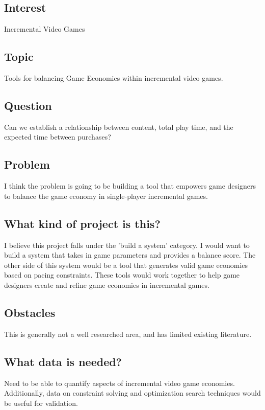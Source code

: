 \subsection*{Interest} 
Incremental Video Games

\subsection*{Topic} 
Tools for balancing Game Economies within incremental video games.

\subsection*{Question} 
Can we establish a relationship between content, total play time, and the expected time between purchases?

\subsection*{Problem} 
I think the problem is going to be building a tool that empowers game designers
to balance the game economy in single-player incremental games.

\subsection*{What kind of project is this?} 
I believe this project falls under the 'build a system' category.
I would want to build a system that takes in game parameters and provides a balance score.
The other side of this system would be a tool that generates valid game economies based on pacing constraints.
These tools would work together to help game designers create and refine game economies in incremental games.

\subsection*{Obstacles} 
This is generally not a well researched area, and has limited existing literature.
\subsection*{What data is needed?} 
Need to be able to quantify aspects of incremental video game economies.
Additionally, data on constraint solving and optimization search techniques would be useful for validation.
